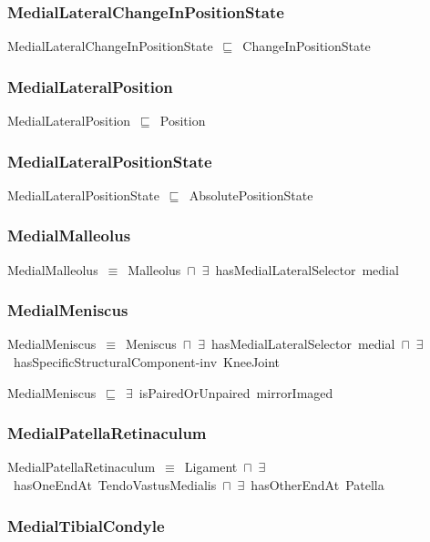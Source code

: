 \documentclass{article}
\begin{document}
\subsubsection*{MedialLateralChangeInPositionState}

MedialLateralChangeInPositionState~\ensuremath{\sqsubseteq}~ChangeInPositionState~

\subsubsection*{MedialLateralPosition}

MedialLateralPosition~\ensuremath{\sqsubseteq}~Position~

\subsubsection*{MedialLateralPositionState}

MedialLateralPositionState~\ensuremath{\sqsubseteq}~AbsolutePositionState~

\subsubsection*{MedialMalleolus}

MedialMalleolus~\ensuremath{\equiv}~Malleolus~\ensuremath{\sqcap}~\ensuremath{\exists}~hasMedialLateralSelector~medial

\subsubsection*{MedialMeniscus}

MedialMeniscus~\ensuremath{\equiv}~Meniscus~\ensuremath{\sqcap}~\ensuremath{\exists}~hasMedialLateralSelector~medial~\ensuremath{\sqcap}~\ensuremath{\exists}~hasSpecificStructuralComponent-inv~KneeJoint

MedialMeniscus~\ensuremath{\sqsubseteq}~\ensuremath{\exists}~isPairedOrUnpaired~mirrorImaged~

\subsubsection*{MedialPatellaRetinaculum}

MedialPatellaRetinaculum~\ensuremath{\equiv}~Ligament~\ensuremath{\sqcap}~\ensuremath{\exists}~hasOneEndAt~TendoVastusMedialis~\ensuremath{\sqcap}~\ensuremath{\exists}~hasOtherEndAt~Patella

\subsubsection*{MedialTibialCondyle}
\end{document}
